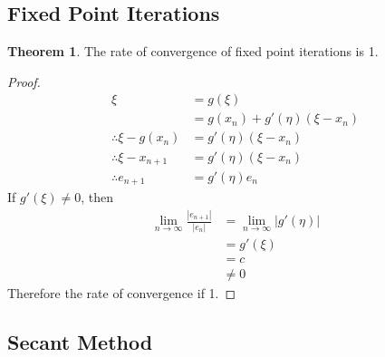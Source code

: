 \documentclass[fleqn, a4paper, 12pt, twoside, titlepage]{article}
\theoremstyle{definition}
\theoremstyle{theorem}
\newtheorem{theorem}{Theorem}
\begin{document}
\subsection{Fixed Point Iterations}

\begin{theorem}
	The rate of convergence of fixed point iterations is 1.
\end{theorem}

\begin{proof}
	\begin{align*}
		\xi &= g(\xi)\\
		&= g(x_n) + g'(\eta) (\xi - x_n)\\
		\therefore \xi - g(x_n) &= g'(\eta) (\xi - x_n)\\
		\therefore \xi - x_{n + 1} &= g'(\eta) (\xi - x_n)\\
		\therefore e_{n + 1} &= g'(\eta) e_n
	\end{align*}
	If $g'(\xi) \neq 0$, then
	\begin{align*}
		\lim\limits_{n \to \infty} \frac{|e_{n + 1}|}{|e_n|} &= \lim\limits_{n \to \infty} \left| g'(\eta) \right|\\
		&= g'(\xi)\\
		&= c\\
		&\neq 0
	\end{align*}
	Therefore the rate of convergence if 1.
\end{proof}

\subsection{Secant Method}
\end{document}
